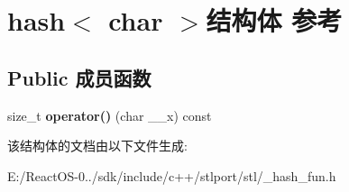 \hypertarget{structhash_3_01char_01_4}{}\section{hash$<$ char $>$结构体 参考}
\label{structhash_3_01char_01_4}
\subsection*{Public 成员函数}
\begin{DoxyCompactItemize}
\item 
\mbox{\label{structhash_3_01char_01_4_ad7273d494f6fed4dda73a127b14a8d46}} 
size\+\_\+t {\bfseries operator()} (char \+\_\+\+\_\+x) const
\end{DoxyCompactItemize}


该结构体的文档由以下文件生成\+:\begin{DoxyCompactItemize}
\item 
E\+:/\+React\+O\+S-\/0../sdk/include/c++/stlport/stl/\+\_\+hash\+\_\+fun.\+h\end{DoxyCompactItemize}
